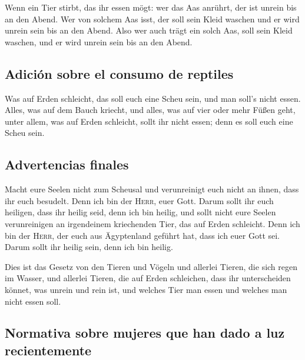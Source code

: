  Wenn ein Tier stirbt, das ihr essen mögt: wer das Aas
anrührt, der ist unrein bis an den Abend.  Wer von
solchem Aas isst, der soll sein Kleid waschen und er wird unrein sein
bis an den Abend. Also wer auch trägt ein solch Aas, soll sein Kleid
waschen, und er wird unrein sein bis an den Abend.

\hypertarget{adiciuxf3n-sobre-el-consumo-de-reptiles}{%
\subsection{Adición sobre el consumo de
reptiles}\label{adiciuxf3n-sobre-el-consumo-de-reptiles}}

 Was auf Erden schleicht, das soll euch eine Scheu sein,
und man soll's nicht essen.  Alles, was auf dem Bauch
kriecht, und alles, was auf vier oder mehr Füßen geht, unter allem, was
auf Erden schleicht, sollt ihr nicht essen; denn es soll euch eine Scheu
sein.

\hypertarget{advertencias-finales}{%
\subsection{Advertencias finales}\label{advertencias-finales}}

 Macht eure Seelen nicht zum Scheusal und verunreinigt
euch nicht an ihnen, dass ihr euch besudelt.  Denn ich
bin der \textsc{Herr}, euer Gott. Darum sollt ihr euch heiligen, dass
ihr heilig seid, denn ich bin heilig, und sollt nicht eure Seelen
verunreinigen an irgendeinem kriechenden Tier, das auf Erden schleicht.
 Denn ich bin der \textsc{Herr}, der euch aus Ägyptenland
geführt hat, dass ich euer Gott sei. Darum sollt ihr heilig sein, denn
ich bin heilig.

 Dies ist das Gesetz von den Tieren und Vögeln und
allerlei Tieren, die sich regen im Wasser, und allerlei Tieren, die auf
Erden schleichen,  dass ihr unterscheiden könnet, was
unrein und rein ist, und welches Tier man essen und welches man nicht
essen soll.

\hypertarget{normativa-sobre-mujeres-que-han-dado-a-luz-recientemente}{%
\subsection{Normativa sobre mujeres que han dado a luz
recientemente}\label{normativa-sobre-mujeres-que-han-dado-a-luz-recientemente}}

